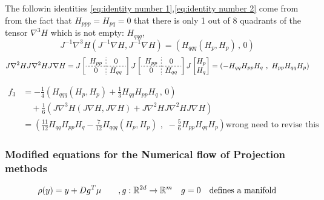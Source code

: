 \documentclass[12pt]{article}
\begin{document}
The followin identities \eqref{eq:identity number 1},\eqref{eq:identity number 2} come from from the fact that $H_{ppp} = H_{pq} = 0$ that there is only 1 out of 8 quadrants of the tensor $\nabla^3H$ which is not empty: $H_{qqq}$, 
\begin{equation}\label{eq:identity number 1}
    J^{-1}\nabla^3 H(J^{-1}\nabla H,J^{-1}\nabla H) = (H_{qqq}(H_p,H_p) \,,\, 0)
\end{equation}
\begin{equation}\label{eq:identity number 2}
    J\nabla^2HJ\nabla^2HJ\nabla H = J\left[\begin{array}{c;{2pt/2pt}c} H_{pp} & 0 \\ \hdashline[2pt/2pt] 0 & H_{qq}\end{array}\right] J\left[\begin{array}{c;{2pt/2pt}c} H_{pp} & 0 \\ \hdashline[2pt/2pt] 0 & H_{qq}\end{array} \right] J \begin{bmatrix} H_p \\ H_q \end{bmatrix}
    = \left( -H_{qq}H_{pp}H_q\,\,,\,\, H_{pp}H_{qq}H_p \right)
\end{equation}

\begin{equation}\label{eq:stromer verlet modified eq f3}
\begin{split}
    f_3 & = -\frac{1}{4}\left( H_{qqq}(H_p,H_p) + \frac{1}{3}H_{qq}H_{pp}H_q \,,\, 0\right)\\
    &\quad +\frac{1}{6} \left(J\nabla^3 H(J\nabla H,J\nabla H) + J\nabla^2HJ\nabla^2HJ\nabla H \right)\\
    & = \left( \frac{11}{12}H_{qq}H_{pp}H_q -\frac{7}{12} H_{qqq}(H_p,H_p) \,\,,\,\, - \frac{5}{6}H_{pp}H_{qq}H_p \right)  \text{wrong need to revise this}
\end{split}
\end{equation}



\subsubsection{Modified equations for the Numerical flow of Projection methods}

\begin{equation}\label{eq:naive projection method}
    \rho(y) = y + Dg^T \mu \qquad, g:\mathbb{R}^{2d}\to\mathbb{R}^m\quad g=0\quad\text{defines a manifold}
\end{equation}
\end{document}
